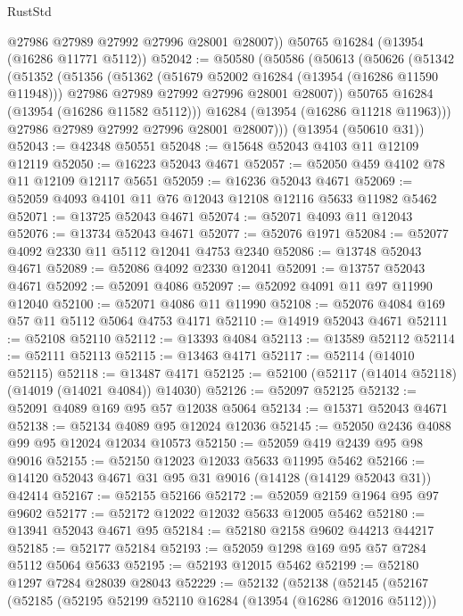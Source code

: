 \begin{lexlean}{RustStd}
\begin{coremodule}
        @27986
        @27989
        @27992
        @27996
        @28001
        @28007))
    @50765
    @16284
    (@13954 (@16286 @11771 @5112))
@52042 := @50580
    (@50586
      (@50613
        (@50626
          (@51342
            (@51352
              (@51356
                (@51362
                  (@51679 @52002 @16284 (@13954 (@16286 @11590 @11948)))
                  @27986
                  @27989
                  @27992
                  @27996
                  @28001
                  @28007))
              @50765
              @16284
              (@13954 (@16286 @11582 @5112)))
            @16284
            (@13954 (@16286 @11218 @11963)))
          @27986
          @27989
          @27992
          @27996
          @28001
          @28007)))
    (@13954 (@50610 @31))
@52043 := @42348 @50551
@52048 := @15648 @52043 @4103 @11 @12109 @12119
@52050 := @16223 @52043 @4671
@52057 := @52050 @459 @4102 @78 @11 @12109 @12117 @5651
@52059 := @16236 @52043 @4671
@52069 := @52059 @4093 @4101 @11 @76 @12043 @12108 @12116 @5633 @11982 @5462
@52071 := @13725 @52043 @4671
@52074 := @52071 @4093 @11 @12043
@52076 := @13734 @52043 @4671
@52077 := @52076 @1971
@52084 := @52077 @4092 @2330 @11 @5112 @12041 @4753 @2340
@52086 := @13748 @52043 @4671
@52089 := @52086 @4092 @2330 @12041
@52091 := @13757 @52043 @4671
@52092 := @52091 @4086
@52097 := @52092 @4091 @11 @97 @11990 @12040
@52100 := @52071 @4086 @11 @11990
@52108 := @52076 @4084 @169 @57 @11 @5112 @5064 @4753 @4171
@52110 := @14919 @52043 @4671
@52111 := @52108 @52110
@52112 := @13393 @4084
@52113 := @13589 @52112
@52114 := @52111 @52113
@52115 := @13463 @4171
@52117 := @52114 (@14010 @52115)
@52118 := @13487 @4171
@52125 := @52100 (@52117 (@14014 @52118) (@14019 (@14021 @4084)) @14030)
@52126 := @52097 @52125
@52132 := @52091 @4089 @169 @95 @57 @12038 @5064
@52134 := @15371 @52043 @4671
@52138 := @52134 @4089 @95 @12024 @12036
@52145 := @52050 @2436 @4088 @99 @95 @12024 @12034 @10573
@52150 := @52059 @419 @2439 @95 @98 @9016
@52155 := @52150 @12023 @12033 @5633 @11995 @5462
@52166 := @14120 @52043 @4671 @31 @95 @31 @9016 (@14128 (@14129 @52043 @31)) @42414
@52167 := @52155 @52166
@52172 := @52059 @2159 @1964 @95 @97 @9602
@52177 := @52172 @12022 @12032 @5633 @12005 @5462
@52180 := @13941 @52043 @4671 @95
@52184 := @52180 @2158 @9602 @44213 @44217
@52185 := @52177 @52184
@52193 := @52059 @1298 @169 @95 @57 @7284 @5112 @5064 @5633
@52195 := @52193 @12015 @5462
@52199 := @52180 @1297 @7284 @28039 @28043
@52229 := @52132
    (@52138
      (@52145
        (@52167
          (@52185
            (@52195 @52199 @52110 @16284 (@13954 (@16286 @12016 @5112)))

\end{coremodule}
\end{lexlean}
